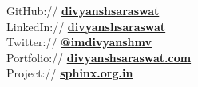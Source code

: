 \documentclass[]{deedy-resume-openfont}
\begin{document}
\begin{minipage}[t]{0.33\textwidth}
GitHub:// \href{https://github.com/divyanshsaraswat}{\bf divyanshsaraswat} \\

LinkedIn:// \href{https://www.linkedin.com/in/divyanshsaraswat}{\bf divyanshsaraswat} \\

Twitter:// \href{https://twitter.com/imdivyanshmv}{\bf @imdivyanshmv} \\

Portfolio:// \href{https://portfolio-demo-topaz.vercel.app/}{\bf divyanshsaraswat.com} \\

Project:// \href{https://www.sphinx.org.in}{\bf sphinx.org.in}



\end{minipage} 

\hfill
\end{document}

